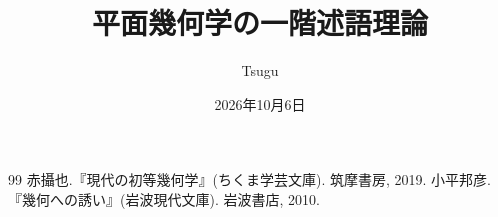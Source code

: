 \documentclass[dvipdfmx,12pt]{jbook}
\title{平面幾何学の一階述語理論}
\date{2026年10月6日}
\author{Tsugu}
\theoremstyle{definition}
\theoremstyle{definition}
\begin{document}
  \maketitle
  
  \tableofcontents
  \setcounter{page}{1}
  
  
  \begin{thebibliography}{99}
     赤攝也.『現代の初等幾何学』(ちくま学芸文庫). 筑摩書房, 2019.
     小平邦彦.『幾何への誘い』(岩波現代文庫). 岩波書店, 2010.
  \end{thebibliography}
  \clearpage
  \printindex
\end{document}
